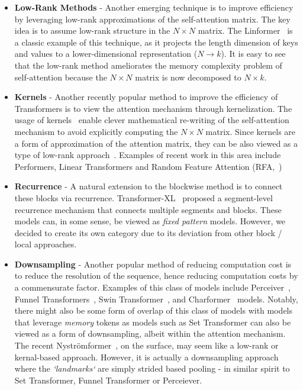 \begin{itemize}
\item \textbf{Low-Rank Methods} - Another emerging technique is to improve efficiency by leveraging low-rank approximations of the self-attention matrix. The key idea is to assume low-rank structure in the $N\times N$ matrix. The Linformer~\citep{wang2020linformer} is a classic example of this technique, as it projects the length dimension of keys and values to a lower-dimensional representation ($N \rightarrow k$). It is easy to see that the low-rank method ameliorates the memory complexity problem of self-attention because the $N \times N$ matrix is now decomposed to $N \times k$.
\item \textbf{Kernels} - Another recently popular method to improve the efficiency of Transformers is to view the attention mechanism through kernelization. The usage of kernels~\citep{katharopoulos2020transformers,choromanski2020masked} enable clever mathematical re-writing of the self-attention mechanism to avoid explicitly computing the $N \times N$ matrix. Since kernels are a form of approximation of the attention matrix, they can be also viewed as a type of low-rank approach~\citep{choromanski2020masked}. Examples of recent work in this area include Performers, Linear Transformers and Random Feature Attention (RFA,~\citep{peng2021random})
\item \textbf{Recurrence} - A natural extension to the blockwise method is to connect these blocks via recurrence. Transformer-XL~\citep{dai2019transformer} proposed a segment-level recurrence mechanism that connects multiple segments and blocks. These models can, in some sense, be viewed as \textit{fixed pattern} models. However, we decided to create its own category due to its deviation from other block / local approaches.
\item \textbf{Downsampling} - Another popular method of reducing computation cost is to reduce the resolution of the sequence, hence reducing computation costs by a commensurate factor. Examples of this class of models include Perceiver~\citep{jaegle2021perceiver}, Funnel Transformers~\citep{dai2020funnel}, Swin Transformer~\citep{liu2021swin}, and Charformer~\citep{tay2021charformer} models. Notably, there might also be some form of overlap of this class of models with models that leverage \textit{memory} tokens as models such as Set Transformer can also be viewed as a form of downsampling, albeit within the attention mechanism. The recent Nystr\"{o}mformer~\citep{xiong2021nystr}, on the surface, may seem like a low-rank or kernal-based approach. However, it is actually a downsampling approach where the \textit{`landmarks`} are simply strided based pooling - in similar spirit to Set Transformer, Funnel Transformer or Perceiever. 

\end{itemize}
